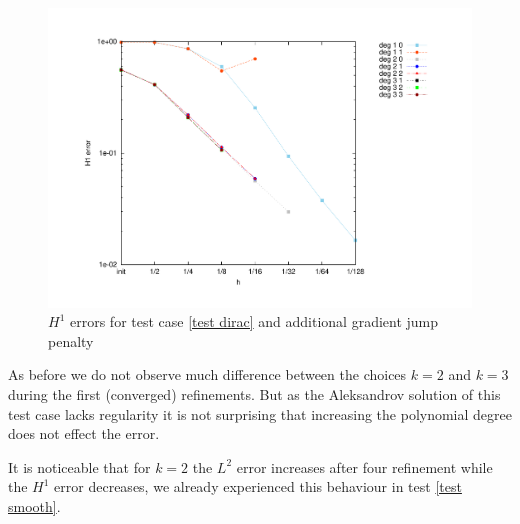 \begin{figure}[H]
		\centering
		\includegraphics[scale =0.4]{plots/MA4_Neilan_GradJump_h1.pdf}
	\caption{$H^1$ errors for test case \ref{test dirac} and additional gradient jump penalty}
	\label{fig: h1 errors test 4 jump}
\end{figure}
As before we do not observe much difference between the choices $k=2$ and $k=3$ during the first (converged) refinements. But as the Aleksandrov solution of this test case lacks regularity it is not surprising that increasing the polynomial degree does not effect the error.

It is noticeable that for $k=2$ the $L^2$ error increases after four refinement while the $H^1$ error decreases, we already experienced this behaviour in test \ref{test smooth}.
